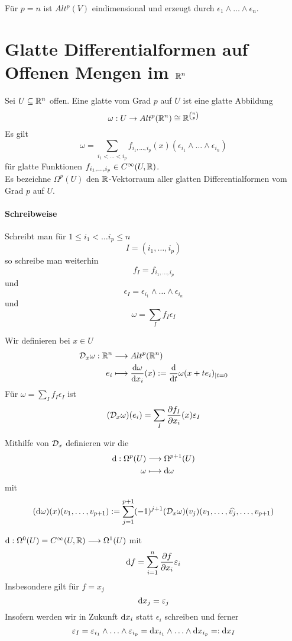 \Bsp{}
Für $p = n$ ist $Alt^p(V)$ eindimensional und erzeugt durch $\epsilon_1 \wedge \ldots \wedge \epsilon_n$.

\section{Glatte Differentialformen auf Offenen Mengen im $\mathbb{R}^n$}
Sei $U \subseteq \mathbb{R}^n$ offen.
\Def{}
Eine glatte  vom Grad $p$ auf $U$ ist eine glatte Abbildung
\[ \omega : U \overset{}{\rightarrow} Alt^p(\mathbb{R}^n) \overset{}{\cong} \mathbb{R}^{\binom{n}{p}} \]
Es gilt
\[ \omega = \sum_{i_1 < \ldots <i_p} f_{i_1,\ldots, i_p}(x) (\epsilon_{i_1} \wedge \ldots \wedge \epsilon_{i_n}) \]
für glatte Funktionen $f_{i_1,\ldots,i_p} \in C^\infty (U,\mathbb{R})$.\\
Es bezeichne $\Omega^p(U)$ den $\mathbb{R}$-Vektorraum aller glatten Differentialformen vom Grad $p$ auf $U$.

\paragraph{Schreibweise} Schreibt man für $1\leq i_1< \ldots i_p\leq n$
\[ I = (i_1, \ldots, i_p)  \]
so schreibe man weiterhin
\[ f_I = f_{i_1,\ldots, i_p} \]
und
\[ \epsilon_I = \epsilon_{i_1} \wedge \ldots \wedge \epsilon_{i_n} \]
und
\[ \omega = \sum_{I}f_I \epsilon_I \]

\Def{}
Wir definieren  bei $x \in U$
\begin{align*}
\mathcal{D}_x\omega : \mathbb{R}^n & \overset{}{\longrightarrow} Alt^p(\mathbb{R}^n)\\
e_i & \longmapsto  \frac{\text{d} \omega}{\text{d} x_i}(x) := \frac{\text{d}}{\text{d} t} \omega(x + te_i)_{|t = 0}
\end{align*}
Für $\omega = \sum_{I}f_I \epsilon_I$ ist
\[ (\mathcal{D}_x \omega)(e_i) = \sum_{I} \frac{\partial f_I}{\partial x_i}(x) \varepsilon_I \]

\Def{}
Mithilfe von $\mathcal{D}_x$ definieren wir die 
\begin{align*}
\text{d} : \Omega^p(U) & \overset{}{\longrightarrow} \Omega^{p+1}(U)\\
\omega & \longmapsto \text{d} \omega
\end{align*}
mit
\[ (\text{d} \omega)(x)(v_1, \ldots, v_{p+1}) := \sum_{j=1}^{p+1} (-1)^{j+1} (\mathcal{D}_x \omega) (v_j) (v_1, \ldots, \widehat{v_j}, \ldots, v_{p+1}) \]

\Bsp{}
$\text{d} : \Omega^0(U) = C^\infty(U,\mathbb{R}) \overset{}{\longrightarrow} \Omega^1 (U)$ mit
\[ \text{d} f = \sum_{i = 1}^{n} \frac{\partial f}{\partial x_i} \varepsilon_i \]
Insbesondere gilt für $f = x_j$
\[ \text{d} x_j = \varepsilon_j \]
Insofern werden wir in Zukunft $\text{d} x_i$ statt $\epsilon_i$ schreiben und ferner
\[ \varepsilon_I = \varepsilon_{i_1} \wedge\ldots \wedge \varepsilon_{i_p} = \text{d} x_{i_1} \wedge\ldots \wedge \text{d} x_{i_p} =: \text{d} x_I \]

